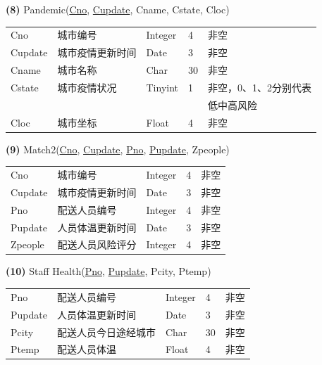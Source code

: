 \documentclass[12pt]{article}
\begin{document}
\vspace{0.5cm}
\noindent \textbf{(8)} Pandemic(\uline{Cno}, \uline{Cupdate}, Cname, Cstate, Cloc)

\begin{center}
	\begin{tabular}{lllll}
		\toprule
		Cno &	城市编号 &	Integer &	4 &	非空 \\
		Cupdate &	城市疫情更新时间 &	Date &	3 &	非空 \\
		Cname &	城市名称 &	Char &	30 &	非空 \\
		Cstate &	城市疫情状况 &	Tinyint &	1 &	非空，0、1、2分别代表 \\ &&&& 低中高风险 \\
		Cloc &	城市坐标 &	Float &	4 &	非空 \\
		\bottomrule
	\end{tabular}
\end{center}

\vspace{0.5cm}
\noindent \textbf{(9)} Match2(\uline{Cno}, \uline{Cupdate}, \uline{Pno}, \uline{Pupdate}, Zpeople)

\begin{center}
	\begin{tabular}{lllll}
		\toprule
		Cno &	城市编号 &	Integer &	4 &	非空 \\
		Cupdate &	城市疫情更新时间 &	Date &	3 &	非空 \\
		Pno &	配送人员编号 &	Integer &	4 &	非空 \\
		Pupdate &	人员体温更新时间 &	Date &	3 &	非空 \\
		Zpeople &	配送人员风险评分 &	Integer &	4 &	非空 \\
		\bottomrule
	\end{tabular}
\end{center}

\vspace{0.5cm}
\noindent \textbf{(10)} Staff Health(\uline{Pno}, \uline{Pupdate}, Pcity, Ptemp)

\begin{center}
	\begin{tabular}{lllll}
		\toprule
		Pno &	配送人员编号 &	Integer &	4 &	非空 \\
		Pupdate &	人员体温更新时间 &	Date &	3 &	非空 \\
		Pcity &	配送人员今日途经城市 &	Char &	30 &	非空 \\
		Ptemp &	配送人员体温 &	Float &	4 &	非空 \\
		\bottomrule
	\end{tabular}
\end{center}
\end{document}
